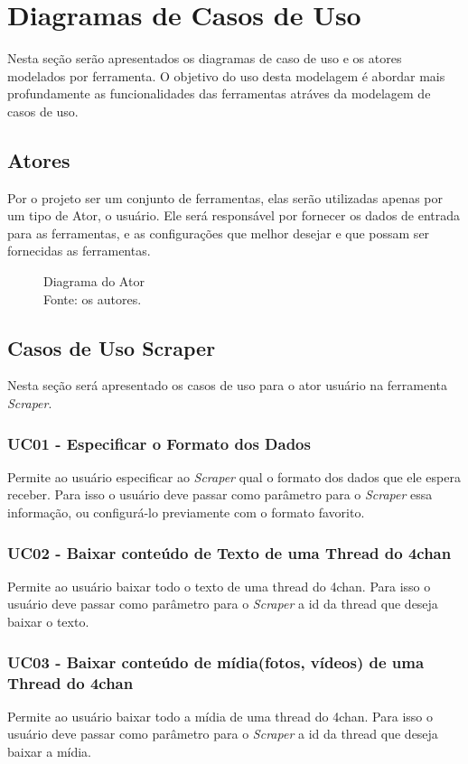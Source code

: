\section{Diagramas de Casos de Uso}
Nesta seção serão apresentados os diagramas de caso de uso e os atores
modelados por ferramenta. O objetivo do uso desta modelagem é abordar mais profundamente as funcionalidades das ferramentas atráves da modelagem de casos de uso. 
\subsection{Atores}
Por o projeto ser um conjunto de ferramentas, elas serão utilizadas apenas por um tipo de Ator, o usuário. Ele será responsável por fornecer os dados de entrada para as ferramentas, e as configurações que melhor desejar e que possam ser fornecidas as ferramentas.
\begin{figure}[H]
    \centering
    
    \caption[Diagrama do Ator]{\label{fig:diagrama_do_ator}
        Diagrama do Ator\\
        Fonte: os autores.
    }
\end{figure}
\subsection{Casos de Uso Scraper}
Nesta seção será apresentado os casos de uso para o ator usuário na ferramenta \textit{Scraper}.
\subsubsection{UC01 - Especificar o Formato dos Dados}
Permite ao usuário especificar ao \textit{Scraper} qual o formato dos dados que ele espera receber. Para isso o usuário deve passar como parâmetro para o \textit{Scraper} essa informação, ou configurá-lo previamente com o formato favorito.
\subsubsection{UC02 - Baixar conteúdo de Texto de uma Thread do 4chan}
Permite ao usuário baixar todo o texto de uma thread do 4chan. Para isso o usuário deve passar como parâmetro para o \textit{Scraper} a id da thread que deseja baixar o texto.
\subsubsection{UC03 - Baixar conteúdo de mídia(fotos, vídeos)  de uma Thread do 4chan}
Permite ao usuário baixar todo a mídia de uma thread do 4chan. Para isso o usuário deve passar como parâmetro para o \textit{Scraper} a id da thread que deseja baixar a mídia.
